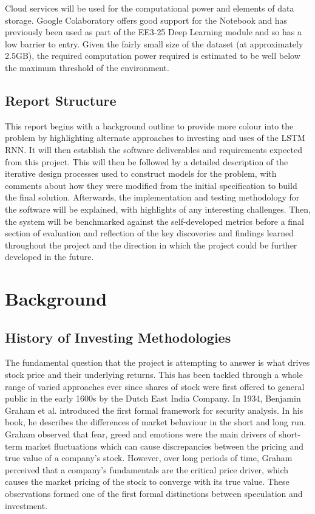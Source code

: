 \documentclass[10pt,onecolumn,letterpaper]{article}
\begin{document}
Cloud services will be used for the computational power and elements of data storage. Google Colaboratory offers good support for the Notebook and has previously been used as part of the EE3-25 Deep Learning module and so has a low barrier to entry. Given the fairly small size of the dataset (at approximately 2.5GB), the required computation power required is estimated to be well below the maximum threshold of the environment. 

\subsection{Report Structure} \label{Report Structure}

This report begins with a background outline to provide more colour into the problem by highlighting alternate approaches to investing and uses of the LSTM RNN. It will then establish the software deliverables and requirements expected from this project. This will then be followed by a detailed description of the iterative design processes used to construct models for the problem, with comments about how they were modified from the initial specification to build the final solution. Afterwards, the implementation and testing methodology for the software will be explained, with highlights of any interesting challenges. Then, the system will be benchmarked against the self-developed metrics before a final section of evaluation and reflection of the key discoveries and findings learned throughout the project and the direction in which the project could be further developed in the future. 

\newpage

\section{Background}

\subsection{History of Investing Methodologies}  \label{History of Investing Methodologies}
The fundamental question that the project is attempting to answer is what drives stock price and their underlying returns. This has been tackled through a whole range of varied approaches ever since shares of stock were first offered to general public in the early 1600s by the Dutch East India Company\cite{Rouwenhorst}. In 1934, Benjamin Graham et al. introduced the first formal framework for security analysis\cite{Graham}. In his book, he describes the differences of market behaviour in the short and long run. Graham observed that fear, greed and emotions were the main drivers of short-term market fluctuations which can cause discrepancies between the pricing and true value of a company's stock. However, over long periods of time, Graham perceived that a company's fundamentals are the critical price driver, which causes the market pricing of the stock to converge with its true value. These observations formed one of the first formal distinctions between speculation and investment.
\end{document}
